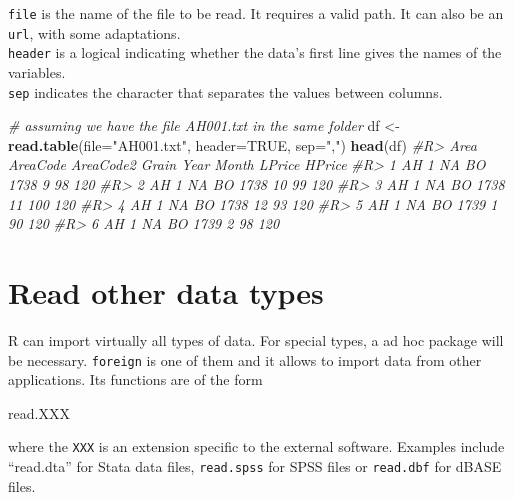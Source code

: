 \documentclass[]{book}
\newenvironment{Shaded}{}{}
\newcommand{\CommentTok}[1]{\textcolor[rgb]{0.38,0.63,0.69}{\textit{#1}}}
\newcommand{\DataTypeTok}[1]{\textcolor[rgb]{0.56,0.13,0.00}{#1}}
\newcommand{\KeywordTok}[1]{\textcolor[rgb]{0.00,0.44,0.13}{\textbf{#1}}}
\newcommand{\NormalTok}[1]{#1}
\newcommand{\OtherTok}[1]{\textcolor[rgb]{0.00,0.44,0.13}{#1}}
\newcommand{\StringTok}[1]{\textcolor[rgb]{0.25,0.44,0.63}{#1}}
\theoremstyle{definition}
\theoremstyle{definition}
\theoremstyle{definition}
\theoremstyle{remark}
\begin{document}
\texttt{file} is the name of the file to be read. It requires a valid
path. It can also be an \texttt{url}, with some adaptations.\\
\texttt{header} is a logical indicating whether the data's first line
gives the names of the variables.\\
\texttt{sep} indicates the character that separates the values between
columns.

\begin{Shaded}
\begin{Highlighting}[]
\CommentTok{# assuming we have the file AH001.txt in the same folder}
\NormalTok{df <-}\StringTok{ }\KeywordTok{read.table}\NormalTok{(}\DataTypeTok{file=}\StringTok{"AH001.txt"}\NormalTok{,}
                \DataTypeTok{header=}\OtherTok{TRUE}\NormalTok{,}
                \DataTypeTok{sep=}\StringTok{","}\NormalTok{)}
\KeywordTok{head}\NormalTok{(df)}
\CommentTok{#R>   Area AreaCode AreaCode2 Grain Year Month LPrice HPrice}
\CommentTok{#R> 1   AH        1        NA    BO 1738     9     98    120}
\CommentTok{#R> 2   AH        1        NA    BO 1738    10     99    120}
\CommentTok{#R> 3   AH        1        NA    BO 1738    11    100    120}
\CommentTok{#R> 4   AH        1        NA    BO 1738    12     93    120}
\CommentTok{#R> 5   AH        1        NA    BO 1739     1     90    120}
\CommentTok{#R> 6   AH        1        NA    BO 1739     2     98    120}
\end{Highlighting}
\end{Shaded}

\hypertarget{read-other-data-types}{%
\section{Read other data types}\label{read-other-data-types}}

R can import virtually all types of data. For special types, a ad hoc
package will be necessary. \texttt{foreign} is one of them and it allows
to import data from other applications. Its functions are of the form

\begin{Shaded}
\begin{Highlighting}[]
\NormalTok{read.XXX}
\end{Highlighting}
\end{Shaded}

where the \texttt{XXX} is an extension specific to the external
software. Examples include ``read.dta'' for Stata data files,
\texttt{read.spss} for SPSS files or \texttt{read.dbf} for dBASE files.
\end{document}
